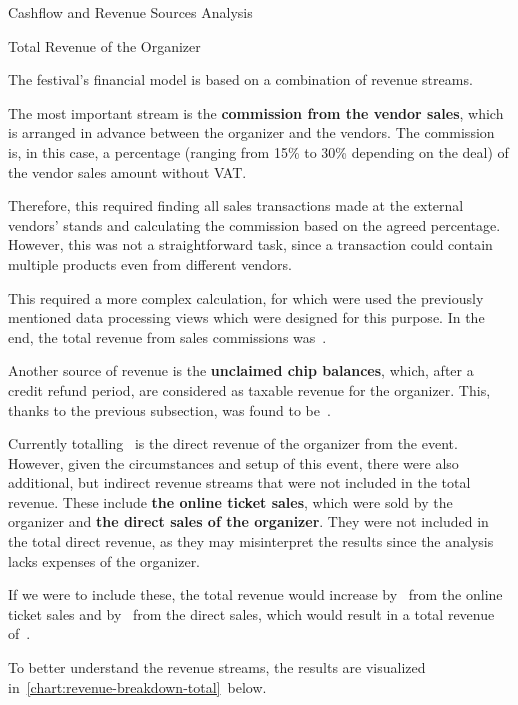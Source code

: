 \begin{section}{Cashflow and Revenue Sources Analysis}
	\pagebreak[4]

	\begin{subsection}{Total Revenue of the Organizer}
		\label{subsec:analysis-total-revenue}

		The festival's financial model is based on a combination of revenue streams.

		The most important stream is the \textbf{commission from the vendor sales}, which is arranged in advance between the organizer and the vendors.
		The commission is, in this case, a percentage (ranging from 15\% to 30\% depending on the deal) of the vendor sales amount without VAT\@.

		Therefore, this required finding all sales transactions made at the external vendors' stands and calculating the commission based on the agreed percentage.
		However, this was not a straightforward task, since a transaction could contain multiple products even from different vendors.

		This required a more complex calculation, for which were used the previously mentioned data processing views which were designed for this purpose.
		In the end, the total revenue from sales commissions was~.

		Another source of revenue is the \textbf{unclaimed chip balances}, which, after a credit refund period, are considered as taxable revenue for the organizer.
		This, thanks to the previous subsection, was found to be~.

		Currently totalling~ is the direct revenue of the organizer from the event.
		However, given the circumstances and setup of this event, there were also additional, but indirect revenue streams that were not included in the total revenue.
		These include \textbf{the online ticket sales}, which were sold by the organizer and \textbf{the direct sales of the organizer}.
		They were not included in the total direct revenue, as they may misinterpret the results since the analysis lacks expenses of the organizer.

		If we were to include these, the total revenue would increase by~ from the online ticket sales and by~ from the direct sales, which would result in a total revenue of~.

		To better understand the revenue streams, the results are visualized in~\autoref{chart:revenue-breakdown-total}~below.


\end{subsection}
\end{section}
